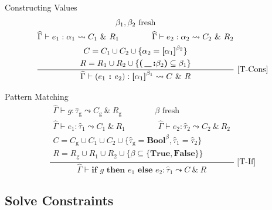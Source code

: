 \documentclass{beamer}
\newcommand{\tauhat}{\widehat{\tau}}
\newcommand{\fresh}{\mbox{\ fresh}}
\newcommand{\also}{\ \&\ }
\newcommand{\TypeRel}[5][\widehat\Gamma]{#1 \vdash #2 : #3 \leadsto #4 \also #5}
\newcommand{\Bool}{\textbf{Bool}}
\newcommand{\TTrue}{\textbf{True}}
\newcommand{\FFalse}{\textbf{False}}
\newcommand{\ListOf}[1]{\textbf{[}#1\textbf{]}}
\newcommand{\Conss}[1]{\textbf{(\,\_\,:}#1\textbf{)}}
\begin{document}
\begin{frame}{Constructing Values}
\[\frac
    {\begin{gathered}\beta_1, \beta_2 \fresh\\\TypeRel{e_1}{\alpha_1}{C_1}{R_1} \quad\quad\quad\quad \TypeRel{e_2}{\alpha_2}{C_2}{R_2} \\ 
    C = C_1 \cup C_2 \cup \{\alpha_2 = \ListOf{\alpha_1}^{\beta_2}\}\\
    R = R_1 \cup R_2 \cup \{ \Conss{\beta_2} \subseteq \beta_1 \}
    \end{gathered}}
    {\begin{gathered}\TypeRel{(e_1 \textbf{\ :\ } e_2)}{\ListOf{\alpha_1}^{\beta_1}}{C}{R}\end{gathered}}
    \mbox{\ [T-Cons]}\]
\end{frame}

\begin{frame}{Pattern Matching}
\[\frac
    {\begin{gathered}\TypeRel{g}{\tauhat_\mathrm{g}}{C_\mathrm{g}}{R_\mathrm{g}}\quad\quad\quad\quad
    \beta \fresh\\
     \TypeRel{e_1}{\tauhat_1}{C_1}{R_1} \quad\quad\quad\quad
     \TypeRel{e_2}{\tauhat_2}{C_2}{R_2} \\
     C = C_\mathrm{g} \cup C_1 \cup C_2 \cup \{\tauhat_\mathrm{g} = \Bool^\beta, \tauhat_1 = \tauhat_2\} \\
     R = R_\mathrm{g} \cup R_1 \cup R_2 \cup \{\beta \subseteq \{\TTrue, \FFalse\}\}
     \end{gathered}}
    {\TypeRel{\textbf{if\ }g\textbf{\ then\ }e_1\textbf{\ else\ }e_2}{\tauhat_1}{C}{R}}
    \mbox{\ [T-If]}\]
\end{frame}

\subsection{Solve Constraints}
\end{document}
